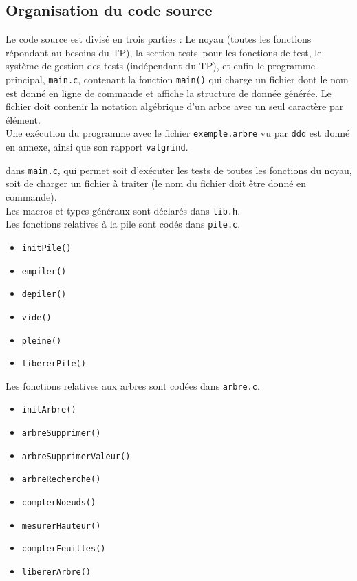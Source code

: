 \documentclass[a4paper,11pt] {article}
\begin{document}
\subsection{Organisation du code source}

Le code source est divisé en trois parties : Le noyau (toutes les fonctions répondant au besoins du TP), la section \og tests\fg\ pour les fonctions de test, le système de gestion des tests (indépendant du TP), et enfin le programme principal, \verb#main.c#, contenant la fonction \verb#main()# qui charge un fichier dont le nom est donné en ligne de commande et affiche la structure de donnée générée. Le fichier doit contenir la notation algébrique d'un arbre avec un seul caractère par élément.\\

Une exécution du programme avec le fichier \verb#exemple.arbre# vu par \verb?ddd? est donné en annexe, ainsi que son rapport \verb?valgrind?.

dans \verb#main.c#, qui permet soit d'exécuter les tests de toutes les fonctions du noyau, soit de charger un fichier à traiter (le nom du fichier doit être donné en commande).\\

Les macros et types généraux sont déclarés dans \verb#lib.h#.\\

Les fonctions relatives à la pile sont codés dans \verb#pile.c#.

\vspace{0.5cm}

\begin{itemize}
	\item \verb#initPile()#
	\item \verb#empiler()#
	\item \verb#depiler()#
	\item \verb#vide()#
	\item \verb#pleine()#
	\item \verb#libererPile()#
\end{itemize}

\vspace{0.5cm}

Les fonctions relatives aux arbres sont codées dans \verb#arbre.c#.\\

\vspace{0.5cm}

\begin{itemize}
    \item \verb#initArbre()#
    \item \verb#arbreSupprimer()#
    \item \verb#arbreSupprimerValeur()#
    \item \verb#arbreRecherche()#
    \item \verb#compterNoeuds()#
    \item \verb#mesurerHauteur()#
    \item \verb#compterFeuilles()#
    \item \verb#libererArbre()#
\end{itemize}
\end{document}
